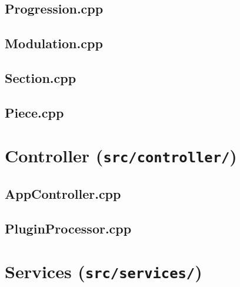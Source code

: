 \subsection{Progression.cpp}


\subsection{Modulation.cpp}


\subsection{Section.cpp}


\subsection{Piece.cpp}


\newpage
\section{Controller (\texttt{src/controller/})}

\subsection{AppController.cpp}


\subsection{PluginProcessor.cpp}


\newpage
\section{Services (\texttt{src/services/})}

